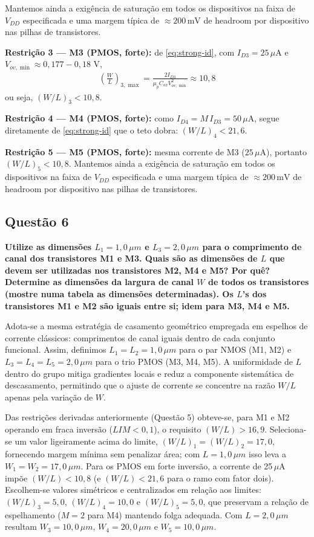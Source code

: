 \documentclass[12pt,a4paper]{article}
\begin{document}
Mantemos ainda a exigência de saturação em todos os dispositivos na faixa de $V_{DD}$ especificada e uma margem típica de $\approx 200\,\text{mV}$ de headroom por dispositivo nas pilhas de transistores.

	\textbf{Restrição 3 — M3 (PMOS, forte):} de \eqref{eq:strong-id}, com $I_{D3}=25\,\mu$A e $V_{ov,\min}\approx 0{,}177{-}0{,}18$ V,
\begin{align}
\left(\frac{W}{L}\right)_{3,\max}=\frac{2 I_{D3}}{\mu_p C_{ox} V_{ov,\min}^2}\approx \boxed{10{,}8}
\end{align}
ou seja, $\boxed{(W/L)_3<10{,}8}$.

	\textbf{Restrição 4 — M4 (PMOS, forte):} como $I_{D4}=M\,I_{D3}=50\,\mu$A, segue diretamente de \eqref{eq:strong-id} que o teto dobra: $\boxed{(W/L)_4<21{,}6}$.

	\textbf{Restrição 5 — M5 (PMOS, forte):} mesma corrente de M3 ($25\,\mu$A), portanto $\boxed{(W/L)_5<10{,}8}$.
Mantemos ainda a exigência de saturação em todos os dispositivos na faixa de $V_{DD}$ especificada e uma margem típica de $\approx 200\,\text{mV}$ de headroom por dispositivo nas pilhas de transistores.

\subsection*{Questão 6}
\begin{BoxQ}
    \textbf{Utilize as dimensões $L_1 = 1{,}0\,\mu m$ e $L_3 = 2{,}0\,\mu m$ para o comprimento de canal dos transistores M1 e M3. Quais são as dimensões de $L$ que devem ser utilizadas nos transistores M2, M4 e M5? Por quê? Determine as dimensões da largura de canal $W$ de todos os transistores (mostre numa tabela as dimensões determinadas). Os $L$’s dos transistores M1 e M2 são iguais entre si; idem para M3, M4 e M5.}\\
\end{BoxQ}\par
Adota-se a mesma estratégia de casamento geométrico empregada em espelhos de corrente clássicos: comprimentos de canal iguais dentro de cada conjunto funcional. Assim, definimos $L_1=L_2=1{,}0\,\mu m$ para o par NMOS (M1, M2) e $L_3=L_4=L_5=2{,}0\,\mu m$ para o trio PMOS (M3, M4, M5). A uniformidade de $L$ dentro do grupo mitiga gradientes locais e reduz a componente sistemática de descasamento, permitindo que o ajuste de corrente se concentre na razão $W/L$ apenas pela variação de $W$.

Das restrições derivadas anteriormente (Questão 5) obteve-se, para M1 e M2 operando em fraca inversão ($LIM<0{,}1$), o requisito $(W/L)>16{,}9$. Seleciona-se um valor ligeiramente acima do limite, $(W/L)_1=(W/L)_2=17{,}0$, fornecendo margem mínima sem penalizar área; com $L=1{,}0\,\mu m$ isso leva a $W_1=W_2=17{,}0\,\mu m$. Para os PMOS em forte inversão, a corrente de 25\,$\mu$A impõe $(W/L)<10{,}8$ (e $(W/L)<21{,}6$ para o ramo com fator dois). Escolhem-se valores simétricos e centralizados em relação aos limites: $(W/L)_3=5{,}0$, $(W/L)_4=10{,}0$ e $(W/L)_5=5{,}0$, que preservam a relação de espelhamento ($M=2$ para M4) mantendo folga adequada. Com $L=2{,}0\,\mu m$ resultam $W_3=10{,}0\,\mu m$, $W_4=20{,}0\,\mu m$ e $W_5=10{,}0\,\mu m$.
\end{document}
